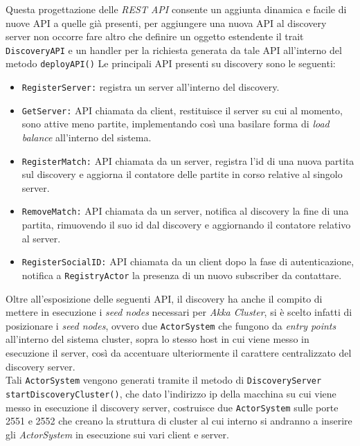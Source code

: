      Questa progettazione delle \textit{REST API} consente un aggiunta dinamica e facile di nuove API a quelle già presenti, per aggiungere una nuova API al discovery server non occorre fare altro che definire un oggetto estendente il trait \texttt{DiscoveryAPI} e un handler per la richiesta generata da tale API all'interno del metodo \texttt{deployAPI()}
     Le principali API presenti su discovery sono le seguenti:

     \begin{itemize}
       \item{\texttt{RegisterServer:}} registra un server all'interno del discovery.

       \item{\texttt{GetServer:}} API chiamata da client, restituisce il server su cui al momento, sono attive meno partite, implementando così una basilare forma di \textit{load balance} all'interno del sistema.

       \item{\texttt{RegisterMatch:}} API chiamata da un server, registra l'id di una nuova partita sul discovery e aggiorna il contatore delle partite in corso relative al singolo server.

       \item{\texttt{RemoveMatch:}} API chiamata da un server, notifica al discovery la fine di una partita, rimuovendo il suo id dal discovery e aggiornando il contatore relativo al server.

       \item{\texttt{RegisterSocialID:}} API chiamata da un client dopo la fase di autenticazione, notifica a \texttt{RegistryActor} la presenza di un nuovo subscriber da contattare.
     \end{itemize}

     Oltre all'esposizione delle seguenti API, il discovery ha anche il compito di mettere in esecuzione i \textit{seed nodes} necessari per \textit{Akka Cluster}, si è scelto infatti di posizionare i \textit{seed nodes}, ovvero due \texttt{ActorSystem} che fungono da \textit{entry points} all'interno del sistema cluster, sopra lo stesso host in cui viene messo in esecuzione il server, così da accentuare ulteriormente il carattere centralizzato del discovery server.\\
      Tali \texttt{ActorSystem} vengono generati tramite il metodo di \texttt{DiscoveryServer} \texttt{startDiscoveryCluster()}, che dato l'indirizzo ip della macchina su cui viene messo in esecuzione il discovery server, costruisce due \texttt{ActorSystem} sulle porte 2551 e 2552 che creano la struttura di cluster al cui interno si andranno a inserire gli \textit{ActorSystem} in esecuzione sui vari client e server.

